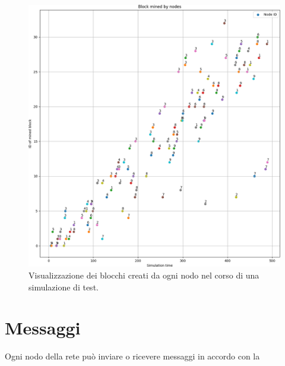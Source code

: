 \begin{figure}[H]
    \centering
    \includegraphics[width=\textwidth]{images/blockmined.png}
    \caption{Visualizzazione dei blocchi creati da ogni nodo nel corso di una simulazione di test.}
\end{figure}

\section{Messaggi}
Ogni nodo della rete può inviare o ricevere messaggi in accordo con la 




